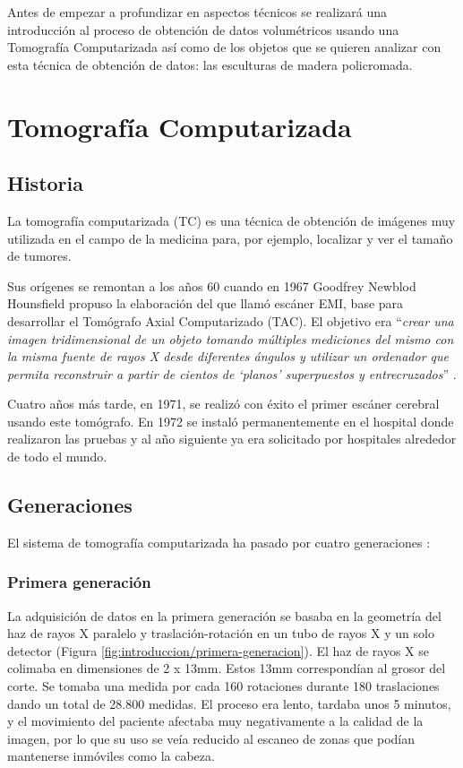 Antes de empezar a profundizar en aspectos técnicos se realizará una introducción al proceso de obtención de datos volumétricos usando una Tomografía Computarizada así como de los objetos que se quieren analizar con esta técnica de obtención de datos: las esculturas de madera policromada.

\section{Tomografía Computarizada}

\subsection{Historia}

La tomografía computarizada (TC) es una técnica de obtención de imágenes muy utilizada en el campo de la medicina para, por ejemplo, localizar y ver el tamaño de tumores.

Sus orígenes se remontan a los años 60 cuando en 1967 Goodfrey Newblod Hounsfield propuso la elaboración del que llamó escáner EMI, base para desarrollar el Tomógrafo Axial Computarizado (TAC). El objetivo era ``\textit{crear una imagen tridimensional de un objeto tomando múltiples mediciones del mismo con la misma fuente de rayos X desde diferentes ángulos y utilizar un ordenador que permita reconstruir a partir de cientos de `planos' superpuestos y entrecruzados}'' \cite{gonzales11}.

Cuatro años más tarde, en 1971, se realizó con éxito el primer escáner cerebral usando este tomógrafo. En 1972 se instaló permanentemente en el hospital donde realizaron las pruebas y al año siguiente ya era solicitado por hospitales alrededor de todo el mundo.

\subsection{Generaciones}

El sistema de tomografía computarizada ha pasado por cuatro generaciones \cite{sarrio16}:

\subsubsection{Primera generación}

La adquisición de datos en la primera generación se basaba en la geometría del haz de rayos X paralelo y traslación-rotación en un tubo de rayos X y un solo detector (Figura \ref{fig:introduccion/primera-generacion}). El haz de rayos X se colimaba en dimensiones de 2 x 13mm. Estos 13mm correspondían al grosor del corte. Se tomaba una medida por cada 160 rotaciones durante 180 traslaciones dando un total de 28.800 medidas. El proceso era lento, tardaba unos 5 minutos, y el movimiento del paciente afectaba muy negativamente a la calidad de la imagen, por lo que su uso se veía reducido al escaneo de zonas que podían mantenerse inmóviles como la cabeza.

